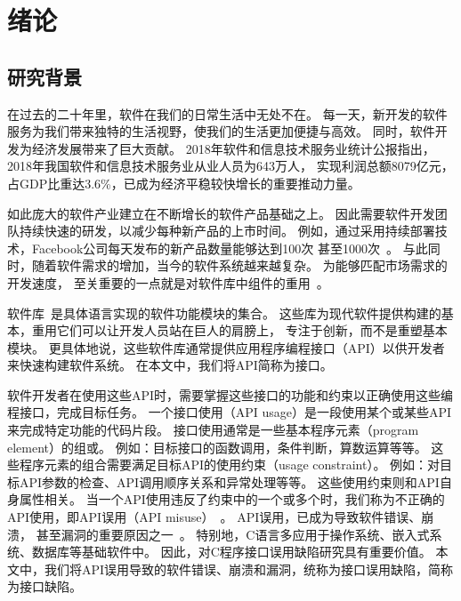 \chapter{绪论}
\label{cha:intro}

\section{研究背景}
在过去的二十年里，软件在我们的日常生活中无处不在。
每一天，新开发的软件服务为我们带来独特的生活视野，使我们的生活更加便捷与高效。
同时，软件开发为经济发展带来了巨大贡献。
2018年软件和信息技术服务业统计公报指出，
2018年我国软件和信息技术服务业从业人员为643万人，
实现利润总额8079亿元，占GDP比重达3.6\%，已成为经济平稳较快增长的重要推动力量\cite{2018-china-report}。


如此庞大的软件产业建立在不断增长的软件产品基础之上。
因此需要软件开发团队持续快速的研发，以减少每种新产品的上市时间。
例如，通过采用持续部署技术，Facebook公司每天发布的新产品数量能够达到100次
甚至1000次~\cite{16-icse-continuous}。
与此同时，随着软件需求的增加，当今的软件系统越来越复杂。
为能够匹配市场需求的开发速度，
至关重要的一点就是对软件库中组件的重用~\cite{2011-icsr-reuse, 2013-cbse-reuse}。

软件库~\cite{library}是具体语言实现的软件功能模块的集合。
这些库为现代软件提供构建的基本，重用它们可以让开发人员站在巨人的肩膀上，
专注于创新，而不是重塑基本模块。
更具体地说，这些软件库通常提供应用程序编程接口（API）以供开发者来快速构建软件系统。
在本文中，我们将API简称为接口。


软件开发者在使用这些API时，需要掌握这些接口的功能和约束以正确使用这些编程接口，完成目标任务。
一个接口使用（API usage）是一段使用某个或某些API来完成特定功能的代码片段。
接口使用通常是一些基本程序元素（program element）的组或。
例如：目标接口的函数调用，条件判断，算数运算等等。
这些程序元素的组合需要满足目标API的使用约束（usage constraint）。
例如：对目标API参数的检查、API调用顺序关系和异常处理等等。
这些使用约束则和API自身属性相关。
当一个API使用违反了约束中的一个或多个时，我们称为不正确的API使用，即API误用（API misuse）~\cite{16-msr-mubench}。
API误用，已成为导致软件错误、崩溃，
甚至漏洞的重要原因之一~\cite{12-ccs-android,12-ccs-ssl,13-ccs-misuse,13-tosem-missing-call,14-apsys-case,15-icpc-api,16-ase-spec}。
特别地，C语言多应用于操作系统、嵌入式系统、数据库等基础软件中。
因此，对C程序接口误用缺陷研究具有重要价值。
本文中，我们将API误用导致的软件错误、崩溃和漏洞，统称为接口误用缺陷，简称为接口缺陷。


